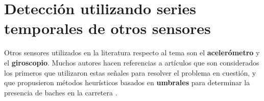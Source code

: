 










\section{Detección utilizando series temporales de otros sensores}
	Otros sensores utilizados en la literatura respecto al tema son el \textbf{acelerómetro} y el \textbf{giroscopio}. Muchos
	autores hacen referencias a artículos que son considerados los primeros que utilizaron estas señales para resolver el 
	problema en cuestión, y que propusieron métodos heurísticos basados en \textbf{umbrales} para determinar la presencia de
	baches en la carretera .

